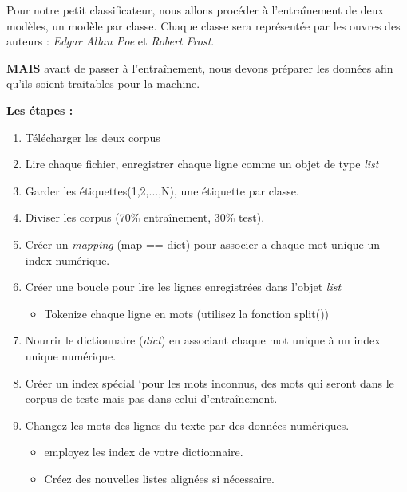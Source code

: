 \vspace{0.5cm}
Pour notre petit classificateur, nous allons procéder à l’entraînement de deux modèles, un modèle par classe. Chaque classe sera représentée par les ouvres des auteurs : \textit{Edgar Allan Poe} et \textit{Robert Frost}. 

\textbf{MAIS} avant de passer à l'entraînement, nous devons préparer les données afin qu'ils soient traitables pour la machine.

\vspace{0.5cm}

\textbf{Les étapes :}

\begin{enumerate}
	\item Télécharger les deux corpus
	\item Lire chaque fichier, enregistrer chaque ligne comme un objet de type \textit{list}
	\item Garder les étiquettes(1,2,...,N), une étiquette par classe.
	\item Diviser les corpus (70\% entraînement, 30\% test).
	\item Créer un \textit{mapping} (map == dict) pour associer a chaque mot unique un index numérique.
	\item Créer une boucle pour lire les lignes enregistrées dans l'objet \textit{list}
	\begin{itemize}
		\item Tokenize chaque ligne en mots (utilisez la fonction split())
	\end{itemize} 
	\item Nourrir le dictionnaire (\textit{dict}) en associant chaque mot unique à un index unique numérique.
	\item Créer un index spécial `pour les mots inconnus, des mots qui seront dans le corpus de teste mais pas dans celui d'entraînement.
	\item Changez les mots des lignes du texte par des données numériques.
	\begin{itemize}
		\item employez les index de votre dictionnaire.
		\item Créez des nouvelles listes alignées si nécessaire.
	\end{itemize}
	
\end{enumerate}




